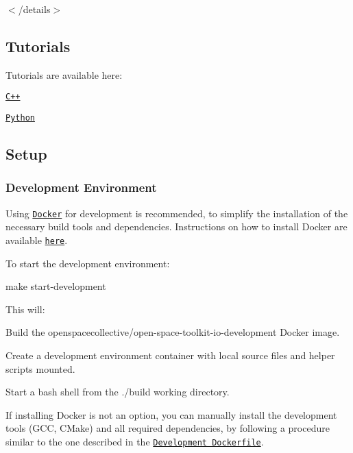$<$/details$>$

\subsection*{Tutorials}

Tutorials are available here\+:


\begin{DoxyItemize}
\item \href{./tutorials/cpp}{\tt C++}
\item \href{./tutorials/python}{\tt Python}
\end{DoxyItemize}

\subsection*{Setup}

\subsubsection*{Development Environment}

Using \href{https://www.docker.com}{\tt Docker} for development is recommended, to simplify the installation of the necessary build tools and dependencies. Instructions on how to install Docker are available \href{https://docs.docker.com/install/}{\tt here}.

To start the development environment\+:


\begin{DoxyCode}
make start-development
\end{DoxyCode}


This will\+:


\begin{DoxyEnumerate}
\item Build the {\ttfamily openspacecollective/open-\/space-\/toolkit-\/io-\/development} Docker image.
\item Create a development environment container with local source files and helper scripts mounted.
\item Start a {\ttfamily bash} shell from the {\ttfamily ./build} working directory.
\end{DoxyEnumerate}

If installing Docker is not an option, you can manually install the development tools (G\+CC, C\+Make) and all required dependencies, by following a procedure similar to the one described in the \href{./docker/development/Dockerfile}{\tt Development Dockerfile}.

